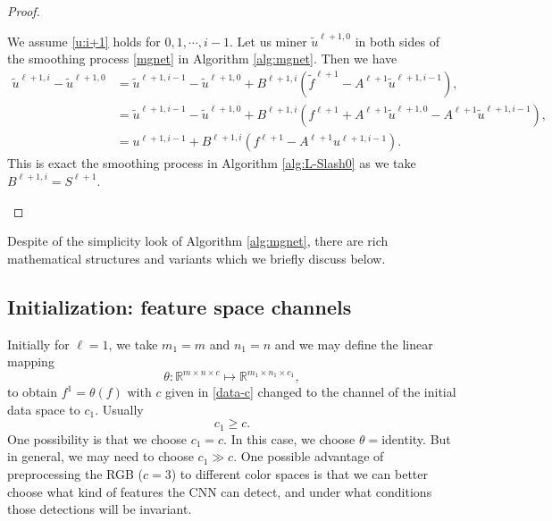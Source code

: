 \begin{proof}
\begin{itemize}
\begin{itemize}
			We assume \eqref{u:i+1} holds for $0,1,\cdots,i-1$. Let us miner $\tilde u^{\ell+1, 0}$ in both sides of 
			the smoothing process \eqref{mgnet} in Algorithm \ref{alg:mgnet}. Then we have
			\begin{align*}
			\tilde u^{\ell+1,i} - \tilde u^{\ell+1, 0} &= \tilde u^{\ell+1,i-1} - \tilde u^{\ell+1, 0} + B^{\ell+1,i} (\tilde f^{\ell+1} - A^{\ell+1} \tilde u^{\ell+1,i-1}), \\
			&= \tilde u^{\ell+1,i-1} - \tilde u^{\ell+1, 0} + B^{\ell+1,i} (f^{\ell+1} + A^{\ell+1}\tilde u^{\ell+1,0} - A^{\ell+1} \tilde u^{\ell+1,i-1} ),\\ 
			&= u^{\ell+1,i-1} + B^{\ell+1,i} (f^{\ell+1} - A^{\ell+1}u^{\ell+1,i-1} ).
			\end{align*}
			This is exact the smoothing process in Algorithm \ref{alg:L-Slash0} as we take $ B^{\ell+1,i} = S^{\ell+1}$.
		\end{itemize}
	\end{itemize}
\end{proof}

Despite of the simplicity look of Algorithm \ref{alg:mgnet}, there
are rich mathematical structures and variants which we briefly discuss below.

\subsection{Initialization: feature space channels}
Initially for $\ell=1$,  we take $m_1 = m$ and $n_1 = n$ and we may define the linear mapping 
\begin{equation}
\label{eq:6}
\theta: \mathbb R^{m\times n\times c}
\mapsto \mathbb R^{m_1\times n_1\times c_1},
\end{equation}
to obtain $f^{1} = \theta(f)$ with $c$ given in \eqref{data-c} changed to the channel of the initial
data space to $c_1$.   Usually
\begin{equation}
\label{cc}
c_1\ge c.  
\end{equation}
One possibility is that we choose $c_1=c$.  In this case, we choose
$\theta=$identity.   But in general, we may need to choose $c_1\gg
c$. One possible advantage of preprocessing the RGB ($c=3$) to 
different color spaces is that we can better choose what kind of
features the CNN can detect, and under what 
conditions those detections will be invariant.

